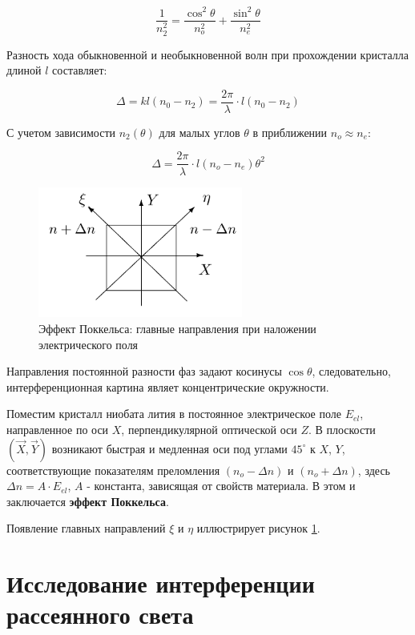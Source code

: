 \documentclass[15pt,a5paper,reqno]{article}
\begin{document}
	\[ \frac{1}{n_2^2} = \frac{\cos^2\theta}{n_o^2} + \frac{\sin^2\theta}{n_e^2} \]
	
	Разность хода обыкновенной и необыкновенной волн при прохождении кристалла длиной $l$ составляет: 
	
	\[ \Delta = kl(n_0 - n_2) = \frac{2\pi}{\lambda} \cdot l (n_0 - n_2) \]
	
	С учетом зависимости $n_2(\theta)$ для малых углов $\theta$ в приближении $n_o \approx n_e$: 
	
	\begin{equation}
		\Delta = \frac{2\pi}{\lambda}\cdot l (n_o - n_e)\theta^2 
	\end{equation}
	
	\begin{figure}[h!]
		\centering
		\includegraphics[width=0.6\textwidth]{pics/maindir}
		\caption{Эффект Поккельса: главные направления при наложении электрического поля}
		\label{dir}
	\end{figure}
	
	
	Направления постоянной разности фаз задают косинусы $\cos\theta$, следовательно, интерференционная картина являет концентрические окружности. 
	
	Поместим кристалл ниобата лития в постоянное электрическое поле $E_{el}$, направленное по оси $X$, перпендикулярной оптической оси $Z$. В плоскости $(\overrightarrow{X}, \overrightarrow{Y})$ возникают быстрая и медленная оси под углами $45^\circ$ к $X$, $Y$, соответствующие показателям преломления $(n_o - \Delta n)$ и $(n_o + \Delta n)$, здесь $\Delta n = A\cdot E_{el}$, $A$ - константа, зависящая от свойств материала. В этом и заключается \textbf{эффект Поккельса}. 
	
	Появление главных направлений $\xi$ и $\eta$ иллюстрирует рисунок \ref{dir}. 
	
	\section{Исследование интерференции рассеянного света}
\end{document}
